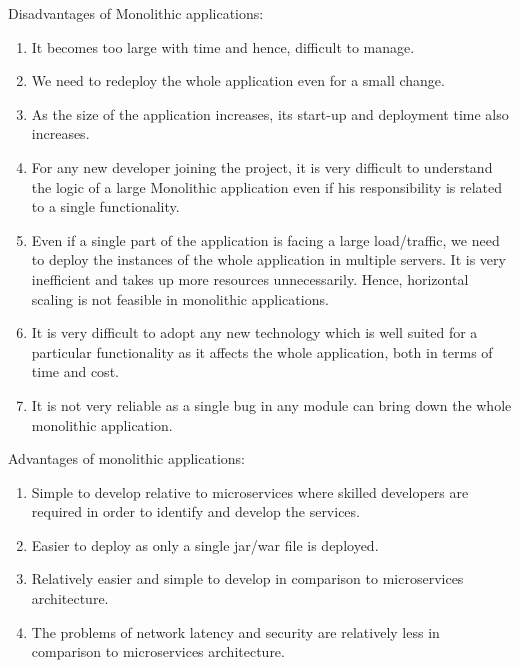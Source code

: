 Disadvantages of Monolithic applications:
\begin{enumerate}
      \item
            It becomes too large with time and hence, difficult to manage.
      \item
            We need to redeploy the whole application even for a small change.
      \item
            As the size of the application increases, its start-up and deployment time also increases.
      \item
            For any new developer joining the project, it is very difficult to understand the logic of a large Monolithic application even if his responsibility is related to a single functionality.
      \item
            Even if a single part of the application is facing a large load/traffic, we need to deploy the instances of the whole application in multiple servers. It is very inefficient and takes up more resources unnecessarily. Hence, horizontal scaling is not feasible in monolithic applications.
      \item
            It is very difficult to adopt any new technology which is well suited for a particular functionality as it affects the whole application, both in terms of time and cost.
      \item
            It is not very reliable as a single bug in any module can bring down the whole monolithic application.
\end{enumerate}
Advantages of monolithic applications:
\begin{enumerate}
      \item
            Simple to develop relative to microservices where skilled developers are required in order to identify and develop the services.
      \item
            Easier to deploy as only a single jar/war file is deployed.
      \item
            Relatively easier and simple to develop in comparison to microservices architecture.
      \item
            The problems of network latency and security are relatively less in comparison to microservices architecture.
\end{enumerate}






